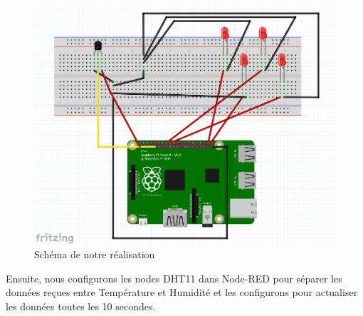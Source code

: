 \begin{figure}[H]
\centering
\includegraphics[width=15cm]{Images/RaspberryVisual.png}
\caption{Schéma de notre réalisation}
\label{Chap4.3.13}
\end{figure}

Ensuite, nous configurons les nodes DHT11 dans Node-RED pour séparer les données reçues entre Température et Humidité et les configurons pour actualiser les données toutes les 10 secondes.

